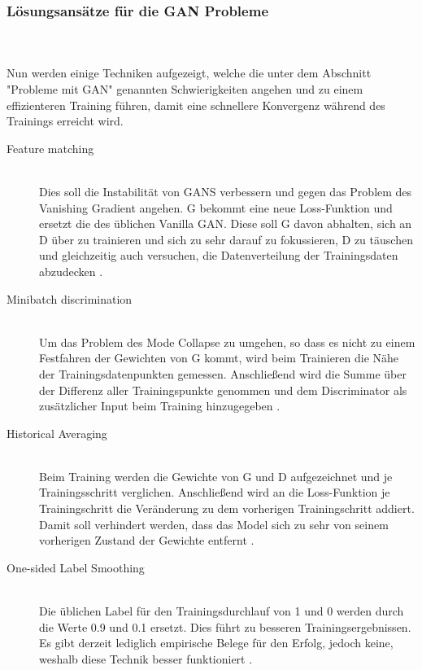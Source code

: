 \documentclass{llncs}
\begin{document}
\subsubsection{Lösungsansätze für die GAN Probleme}
~\\\\
Nun werden einige Techniken aufgezeigt, welche die unter dem Abschnitt "Probleme mit GAN" genannten Schwierigkeiten angehen und zu einem effizienteren Training führen, damit eine schnellere Konvergenz während des Trainings erreicht wird.
\\
\begin{description}
\item[Feature matching]
~\\
Dies soll die Instabilität von GANS verbessern und gegen das Problem des Vanishing Gradient angehen. G bekommt eine neue Loss-Funktion und ersetzt die des üblichen Vanilla GAN. Diese soll G davon abhalten, sich an D über zu trainieren und sich zu sehr darauf zu fokussieren, D zu täuschen und gleichzeitig auch versuchen, die Datenverteilung der Trainingsdaten abzudecken \cite{improvingan}.\\

\item[Minibatch discrimination] 
~\\
Um das Problem des Mode Collapse zu umgehen, so dass es nicht zu einem Festfahren der Gewichten von G kommt, wird beim Trainieren die Nähe der Trainingsdatenpunkten gemessen. Anschließend wird die Summe über der Differenz aller Trainingspunkte genommen und dem Discriminator als zusätzlicher Input beim Training hinzugegeben \cite{improvingan}.\\

\item[Historical Averaging]
~\\
Beim Training werden die Gewichte von G und D aufgezeichnet und je Trainingsschritt verglichen. Anschließend wird an die Loss-Funktion je Trainingschritt die Veränderung zu dem vorherigen Trainingschritt addiert. Damit soll verhindert werden, dass das Model sich zu sehr von seinem vorherigen Zustand der Gewichte entfernt \cite{improvingan}.\\

\item[One-sided Label Smoothing]
~\\
Die üblichen Label für den Trainingsdurchlauf von 1 und 0 werden durch die Werte 0.9 und 0.1 ersetzt. Dies führt zu besseren Trainingsergebnissen. Es gibt derzeit lediglich empirische Belege für den Erfolg, jedoch keine, weshalb diese Technik besser funktioniert \cite{improvingan}.\\


\end{description}
\end{document}
